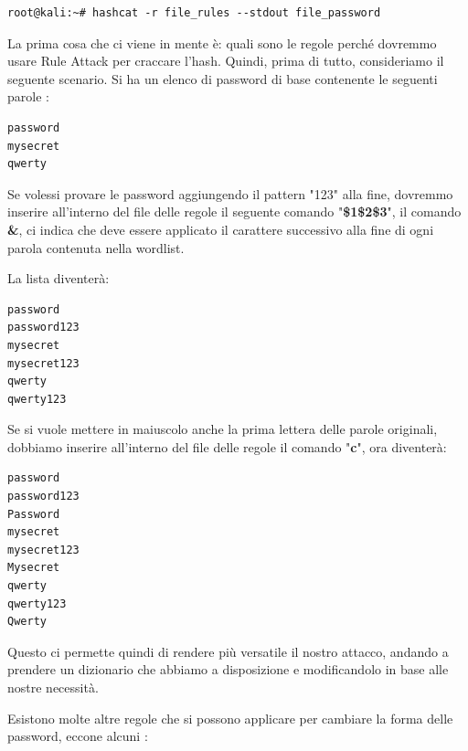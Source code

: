 \begin{lstlisting}[caption={utilizzo di regole su Hashcat }, style=javaScriptCode]
    root@kali:~# hashcat -r file_rules --stdout file_password
    \end{lstlisting}

La prima cosa che ci viene in mente è: quali sono le regole perché dovremmo usare Rule Attack per craccare l'hash. Quindi, prima di tutto, consideriamo il seguente scenario. Si ha un elenco di password di base contenente le seguenti parole :

\begin{lstlisting}[caption={Esempio rule attack wordlist}, style=javaScriptCode]
password
mysecret
qwerty
\end{lstlisting}
Se volessi provare le password aggiungendo il pattern "123" alla fine, dovremmo inserire all'interno del file delle regole il seguente comando "\textbf{\$1\$2\$3}", il comando \textbf{\&}, ci indica che deve essere applicato il carattere successivo alla fine di ogni parola contenuta nella wordlist.

La lista diventerà:
\begin{lstlisting}[caption={Risultato wordlist aggiunto il pattern "123"}, style=javaScriptCode]
password
password123
mysecret
mysecret123
qwerty
qwerty123
\end{lstlisting}

Se si vuole mettere in maiuscolo anche la prima lettera delle parole originali, dobbiamo inserire all'interno del file delle regole il comando "\textbf{c}", ora diventerà:
\begin{lstlisting}[caption={Esempio rule attack wordlist}, style=javaScriptCode]
password
password123
Password
mysecret
mysecret123
Mysecret
qwerty
qwerty123
Qwerty
\end{lstlisting}

Questo ci permette quindi di rendere più versatile il nostro attacco, andando a prendere un dizionario che abbiamo a disposizione e modificandolo in base alle nostre necessità.

Esistono molte altre regole che si possono applicare per cambiare la forma delle password, eccone alcuni :

